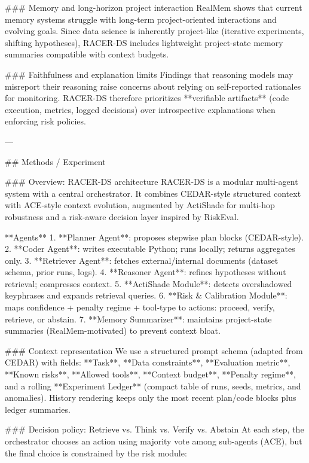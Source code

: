### Memory and long-horizon project interaction  
RealMem shows that current memory systems struggle with long-term project-oriented interactions and evolving goals. Since data science is inherently project-like (iterative experiments, shifting hypotheses), RACER-DS includes lightweight project-state memory summaries compatible with context budgets.

### Faithfulness and explanation limits  
Findings that reasoning models may misreport their reasoning raise concerns about relying on self-reported rationales for monitoring. RACER-DS therefore prioritizes **verifiable artifacts** (code execution, metrics, logged decisions) over introspective explanations when enforcing risk policies.

---

## Methods / Experiment  

### Overview: RACER-DS architecture  
RACER-DS is a modular multi-agent system with a central orchestrator. It combines CEDAR-style structured context with ACE-style context evolution, augmented by ActiShade for multi-hop robustness and a risk-aware decision layer inspired by RiskEval.

**Agents**
1. **Planner Agent**: proposes stepwise plan blocks (CEDAR-style).
2. **Coder Agent**: writes executable Python; runs locally; returns aggregates only.
3. **Retriever Agent**: fetches external/internal documents (dataset schema, prior runs, logs).
4. **Reasoner Agent**: refines hypotheses without retrieval; compresses context.
5. **ActiShade Module**: detects overshadowed keyphrases and expands retrieval queries.
6. **Risk & Calibration Module**: maps confidence + penalty regime + tool-type to actions: proceed, verify, retrieve, or abstain.
7. **Memory Summarizer**: maintains project-state summaries (RealMem-motivated) to prevent context bloat.

### Context representation  
We use a structured prompt schema (adapted from CEDAR) with fields: **Task**, **Data constraints**, **Evaluation metric**, **Known risks**, **Allowed tools**, **Context budget**, **Penalty regime**, and a rolling **Experiment Ledger** (compact table of runs, seeds, metrics, and anomalies). History rendering keeps only the most recent plan/code blocks plus ledger summaries.

### Decision policy: Retrieve vs. Think vs. Verify vs. Abstain  
At each step, the orchestrator chooses an action using majority vote among sub-agents (ACE), but the final choice is constrained by the risk module:

